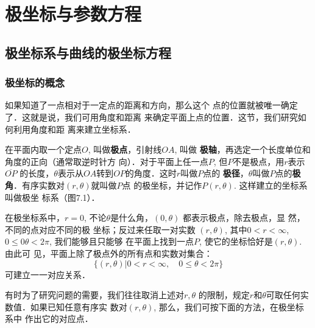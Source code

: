 
\chapter{极坐标与参数方程}

\section{极坐标系与曲线的极坐标方程}
\subsection{极坐标的概念}

如果知道了一点相对于一定点的距离和方向，那么这个
点的位置就被唯一确定了．这就是说，我们可用角度和距离
来确定平面上点的位置．这节，我们研究如何利用角度和距
离来建立坐标系．

在平面内取一个定点$O$, 叫做\textbf{极点}，引射线$OA$, 叫做
\textbf{极轴}，再选定一个长度单位和角度的正向（通常取逆时针方
向）．对于平面上任一点$P$, 但$P$不是极点，用$r$表示$\overline{OP}$
的长度，$\theta$表示从$OA$转到$OP$的角度．这时$r$叫做$P$点的
\textbf{极径}，$\theta$叫做$P$点的\textbf{极角}．有序实数对$(r,\theta)$就叫做$P$点
的极坐标，并记作$P(r,\theta)$. 这样建立的坐标系叫做极坐
标系（图7.1）．

在极坐标系中，$r=0$,
不论$\theta$是什么角，$(0,\theta)$
都表示极点，除去极点，显
然，不同的点对应不同的极
坐标；反过来任取一对实数
$(r,\theta)$, 其中$0<r<\infty$, $0\le 0\theta<2\pi$, 我们能够且只能够
在平面上找到一点$P$, 使它的坐标恰好是$(r,\theta)$. 由此可
见，平面上除了极点外的所有点和实数对集合：
\[\{(r,\theta)|0<r<\infty,\quad 0\le\theta<2\pi\}\]
可建立一一对应关系．

有时为了研究问题的需要，我们往往取消上述对$r,\theta$
的限制，规定$r$和$\theta$可取任何实数值．如果已知任意有序实
数对$(r,\theta)$, 那么，我们可按下面的方法，在极坐标系中
作出它的对应点．

\begin{figure}[htp]\centering
    \begin{minipage}[t]{0.48\textwidth}
    \centering
{}
    \caption{}
    \end{minipage}
    \begin{minipage}[t]{0.48\textwidth}
    \centering
    \caption{}
    \end{minipage}
    \end{figure}


